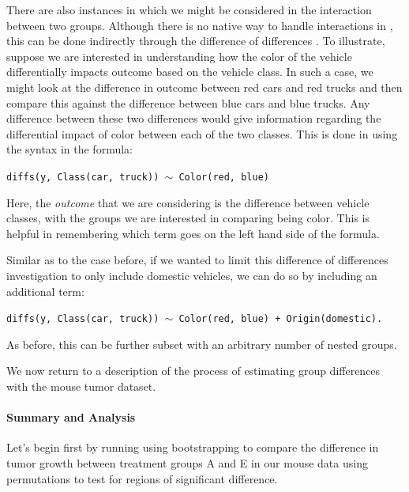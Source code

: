 There are also instances in which we might be considered in the interaction between two groups. Although there is no native way to handle interactions in , this can be done indirectly through the difference of differences \cite{McMurray2019}. To illustrate, suppose we are interested in understanding how the color of the vehicle differentially impacts outcome based on the vehicle class. In such a case, we might look at the difference in outcome between red cars and red trucks and then compare this against the difference between blue cars and blue trucks. Any difference between these two differences would give information regarding the differential impact of color between each of the two classes. This is done in  using the  syntax in the formula:


\begin{center}
\tt diffs(y, Class(car, truck)) $\sim$ Color(red, blue)
\end{center}

Here, the \textit{outcome} that we are considering is the difference between vehicle classes, with the groups we are interested in comparing being color. This is helpful in remembering which term goes on the left hand side of the formula. 

Similar as to the case before, if we wanted to limit this difference of differences investigation to only include domestic vehicles, we can do so by including an additional term:

\begin{center}
\tt diffs(y, Class(car, truck)) $\sim$ Color(red, blue) + Origin(domestic).
\end{center}

As before, this can be further subset with an arbitrary number of nested groups.

We now return to a description of the process of estimating group differences with the mouse tumor dataset.


\paragraph{Summary and Analysis}

Let's begin first by running  using bootstrapping to compare the difference in tumor growth between treatment groups A and E in our mouse data using permutations to test for regions of significant difference. 


